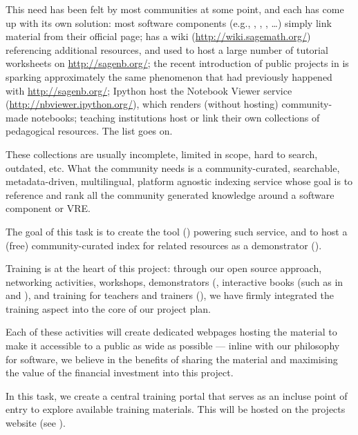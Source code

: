 \begin{workpackage}
\begin{tasklist}
\begin{task}[title=Demonstrator: Computational mathematics resources indexing service,
id=index-librorum-salvificorum,lead=UV,PM=2,partners={UB}]
This need has been felt by most communities at some point, and each
has come up with its own solution: most software components (e.g.,
\GAP, \PariGP, \Sage, \dots) simply link material from their official
page; \Sage has a wiki (\url{http://wiki.sagemath.org/}) referencing
additional resources, and used to host a large number of tutorial
worksheets on \url{http://sagenb.org/}; the recent introduction of
public projects in \SMC is sparking approximately the same phenomenon
that had previously happened with \url{http://sagenb.org/}; Ipython
host the Notebook Viewer service (\url{http://nbviewer.ipython.org/}),
which renders (without hosting) community-made notebooks; teaching
institutions host or link their own collections of pedagogical
resources. The list goes on.

These collections are usually incomplete, limited in scope, hard to
search, outdated, etc.  What the community needs is a
community-curated, searchable, metadata-driven, multilingual, platform
agnostic indexing service whose goal is to reference and rank all the
community generated knowledge around a software component or VRE.

The goal of this task is to create the tool
() powering such service, and to host a
(free) community-curated index for \TheProject related resources as a
demonstrator ().

\end{task}




\begin{task}[title=Training and training portal,
id=training-portal,lead=PS,PM=1] 
Training is at the heart of this project: through our open source
approach, networking activities, workshops, demonstrators
(, interactive books (such
as in  and
), and training for teachers and trainers
(), we have firmly integrated the training
aspect into the core of our project plan.

Each of these activities will create dedicated webpages hosting the
material to make it accessible to a public as wide as possible ---
inline with our philosophy for software, we believe in the benefits of
sharing the material and maximising the value of the financial
investment into this project.

In this task, we create a central \TheProject training portal that
serves as an incluse point of entry to explore available training
materials. This will be hosted on the projects website (see ).
\end{task}
\end{tasklist}




\end{workpackage}
